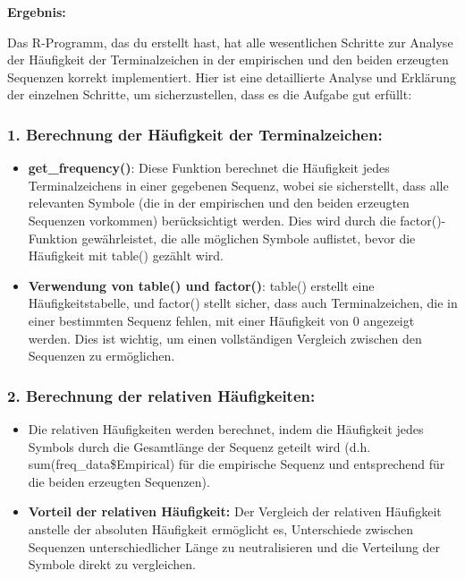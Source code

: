 \documentclass[
]{article}
\begin{document}
\textbf{Ergebnis:}

Das R-Programm, das du erstellt hast, hat alle wesentlichen Schritte zur
Analyse der Häufigkeit der Terminalzeichen in der empirischen und den
beiden erzeugten Sequenzen korrekt implementiert. Hier ist eine
detaillierte Analyse und Erklärung der einzelnen Schritte, um
sicherzustellen, dass es die Aufgabe gut erfüllt:

\subsubsection{\texorpdfstring{\textbf{1. Berechnung der Häufigkeit der
Terminalzeichen:}}{1. Berechnung der Häufigkeit der Terminalzeichen:}}\label{berechnung-der-huxe4ufigkeit-der-terminalzeichen}

\begin{itemize}
\item
  \textbf{get\_frequency()}: Diese Funktion berechnet die Häufigkeit
  jedes Terminalzeichens in einer gegebenen Sequenz, wobei sie
  sicherstellt, dass alle relevanten Symbole (die in der empirischen und
  den beiden erzeugten Sequenzen vorkommen) berücksichtigt werden. Dies
  wird durch die factor()-Funktion gewährleistet, die alle möglichen
  Symbole auflistet, bevor die Häufigkeit mit table() gezählt wird.
\item
  \textbf{Verwendung von table() und factor()}: table() erstellt eine
  Häufigkeitstabelle, und factor() stellt sicher, dass auch
  Terminalzeichen, die in einer bestimmten Sequenz fehlen, mit einer
  Häufigkeit von 0 angezeigt werden. Dies ist wichtig, um einen
  vollständigen Vergleich zwischen den Sequenzen zu ermöglichen.
\end{itemize}

\subsubsection{\texorpdfstring{\textbf{2. Berechnung der relativen
Häufigkeiten:}}{2. Berechnung der relativen Häufigkeiten:}}\label{berechnung-der-relativen-huxe4ufigkeiten}

\begin{itemize}
\item
  Die relativen Häufigkeiten werden berechnet, indem die Häufigkeit
  jedes Symbols durch die Gesamtlänge der Sequenz geteilt wird (d.h.
  sum(freq\_data\$Empirical) für die empirische Sequenz und entsprechend
  für die beiden erzeugten Sequenzen).
\item
  \textbf{Vorteil der relativen Häufigkeit:} Der Vergleich der relativen
  Häufigkeit anstelle der absoluten Häufigkeit ermöglicht es,
  Unterschiede zwischen Sequenzen unterschiedlicher Länge zu
  neutralisieren und die Verteilung der Symbole direkt zu vergleichen.
\end{itemize}
\end{document}
